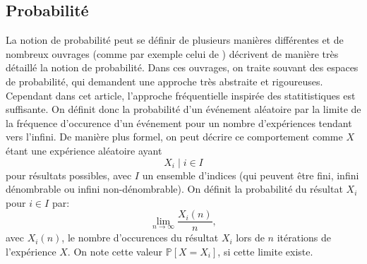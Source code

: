 \documentclass[letterpaper]{article}
\begin{document}
  \subsection{Probabilité}
    \label{probabilite}
    La notion de probabilité peut se définir de plusieurs manières différentes 
    et de nombreux ouvrages (comme par exemple celui de \citet{IP}) décrivent 
    de manière très détaillé la notion de probabilité.  Dans ces ouvrages, on
    traite souvant des espaces de probabilité, qui demandent une approche très 
    abstraite et rigoureuses.  Cependant dans cet article, l'approche
    fréquentielle inspirée des statitistiques est suffisante.
    On définit donc la probabilité d'un événement aléatoire par la limite
    de la fréquence d'occurence d'un événement pour un nombre d'expériences
    tendant vers l'infini.  De manière plus formel, on peut décrire ce
    comportement comme $X$ étant une expérience aléatoire ayant
    $$X_i \mid i \in I $$
    pour résultats possibles, avec $I$ un ensemble d'indices (qui peuvent 
    être fini, infini dénombrable ou infini non-dénombrable).  On définit
    la probabilité du résultat $X_i$ pour $i \in I$ par:
    $$\lim_{n \to \infty}\frac {X_i(n)}n,$$
    avec $X_i(n)$, le nombre d'occurences du résultat $X_i$ lors de
    $n$ itérations de l'expérience $X$.  On note cette valeur
    $\mathbb P[X = X_i]$, si cette limite existe.
    
\end{document}
